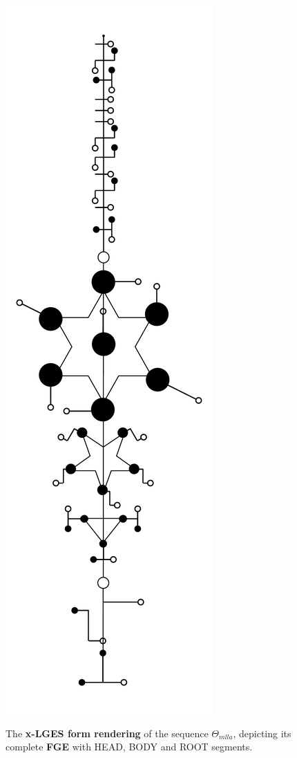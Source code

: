 \documentclass[a4paper, 18pt]{book} %
\begin{document}
\begin{figure}[H]
  \begin{center}
   \includegraphics[trim=0cm 0cm 0cm 0cm, clip, height=0.9\textheight,]{resources/pdfs/xLGES-PLATONIC-MLLA-landscape.pdf}\\
   \caption{The \textbf{x-LGES form rendering} of the sequence $\Theta_{mlla}$, depicting its complete \textbf{FGE} with HEAD, BODY and ROOT segments.}
  \label{FIGLGESMLLA}
  \end{center}
\end{figure}
\end{document}

